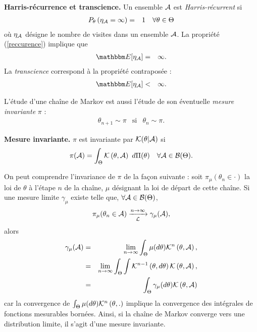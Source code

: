 \begin{definition}{\bf Harris-récurrence et transcience.}
Un ensemble ${\cal{A}}$ est \emph{Harris-récurrent} si
\begin{eqnarray}
P_{\theta}\left(\eta_{\cal{A}} = \infty\right) & = & 1 \ \ \ \forall \theta\in\Theta \label{reccurence}
\end{eqnarray}
où $\eta_{\cal{A}}$ désigne le nombre de visites dans un ensemble ${\cal{A}}$. La propriété (\ref{reccurence}) implique que 
\begin{eqnarray*}
\E[\eta_{\cal{A}}] & = & \infty.
\end{eqnarray*}
La \emph{transcience} correspond à la propriété contraposée :
\begin{eqnarray*}
\E[\eta_{\cal{A}}] & < & \infty.
\end{eqnarray*}
\end{definition}

L'étude d'une chaîne de Markov est aussi l'étude de son éventuelle \emph{mesure invariante} $\pi$ :
\begin{eqnarray*}
\theta_{n+1} \sim \pi & \text{si} & \theta_{n} \sim \pi. \end{eqnarray*}


\begin{definition}{\bf Mesure invariante.}
$\pi$ est invariante par ${\cal{K}}(\theta|{\cal{A}}) $ si
$$
\pi({\cal{A}}) = \int_{\Theta} {\cal{K}}\left(\theta,{\cal{A}}\right) \ d\Pi(\theta) \ \ \ \forall {\cal{A}}\in{\cal{B}}(\Theta).
$$
\end{definition}

On peut comprendre l'invariance de $\pi$ de la fa\c con suivante : soit $\pi_{\mu}(\theta_n\in \cdot)$ la loi de $\theta$ à l'étape $n$ de la chaîne, $\mu$ désignant la loi de départ de cette chaîne. Si une mesure limite $\gamma_{\mu}$ existe telle que,  $\forall {\cal{A}}\in{\cal{B}}(\Theta)$,
$$
\pi_{\mu}(\theta_n\in {\cal{A}}) \xrightarrow[{\cal{L}}]{n\to\infty} \gamma_{\mu}({\cal{A}}),
$$
alors
\begin{eqnarray*}
\gamma_{\mu}({\cal{A}}) & = & \lim\limits_{n\to\infty} \int_{\Theta}  \mu(d\theta) {\cal{K}}^n\left(\theta,{\cal{A}}\right), \\
& = & \lim\limits_{n\to\infty} \int_{\Theta} \int {\cal{K}}^{n-1}\left(\theta,d\theta\right) {\cal{K}}\left(\theta,{\cal{A}}\right), \\
& = & \int_{\Theta}  \gamma_{\mu}(d\theta) {\cal{K}}\left(\theta,{\cal{A}}\right)
\end{eqnarray*}
car la convergence de $\int_{\Theta}  \mu(d\theta) {\cal{K}}^n\left(\theta,.\right)$ implique la convergence des intégrales de fonctions mesurables bornées. Ainsi, si la chaîne de Markov converge vers une distribution limite, il s'agit d'une mesure invariante. \\

